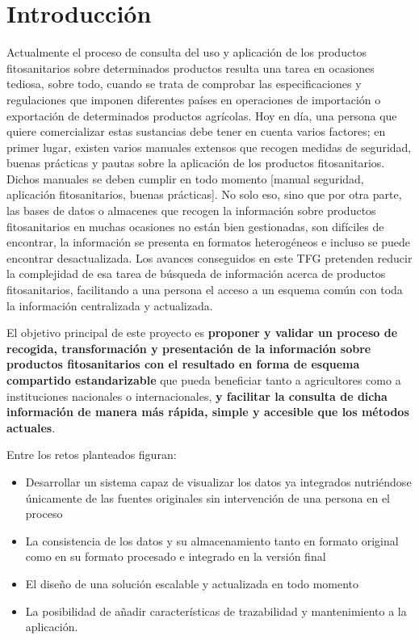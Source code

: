 \chapter{Introducción} \label{introduccion}
Actualmente el proceso de consulta del uso y aplicación de los productos fitosanitarios sobre determinados productos resulta una tarea en ocasiones tediosa, sobre todo, cuando se trata de comprobar las especificaciones y regulaciones que imponen diferentes países en operaciones de importación o exportación de determinados productos agrícolas. Hoy en día, una persona que quiere comercializar estas sustancias debe tener en cuenta varios factores; en primer lugar, existen varios manuales extensos que recogen medidas de seguridad, buenas prácticas y pautas sobre la aplicación de los productos fitosanitarios. Dichos manuales se deben cumplir en todo momento [manual seguridad, aplicación fitosanitarios, buenas prácticas]. No solo eso, sino que por otra parte, las bases de datos o almacenes que recogen la información sobre productos fitosanitarios en muchas ocasiones no están bien gestionadas, son difíciles de encontrar, la información se presenta en formatos heterogéneos e incluso se puede encontrar desactualizada. Los avances conseguidos en este TFG pretenden reducir la complejidad de esa tarea de búsqueda de información acerca de productos fitosanitarios, facilitando a una persona el acceso a un esquema común con toda la información centralizada y actualizada.\par

El objetivo principal de este proyecto es \textbf{proponer y validar un proceso de recogida, transformación y presentación de la información sobre productos fitosanitarios con el resultado en forma de esquema compartido estandarizable} que pueda beneficiar tanto a agricultores como a instituciones nacionales o internacionales, \textbf{y facilitar la consulta de dicha información de manera más rápida, simple y accesible que los métodos actuales}. \par
Entre los retos planteados figuran:
\begin{itemize}
\item Desarrollar un sistema capaz de visualizar los datos ya integrados nutriéndose únicamente de las fuentes originales sin intervención de una persona en el proceso
\item La consistencia de los datos y su almacenamiento tanto en formato original como en su formato procesado e integrado en la versión final
\item El diseño de una solución escalable y actualizada en todo momento
\item La posibilidad de añadir características de trazabilidad y mantenimiento a la aplicación.
\end{itemize}

